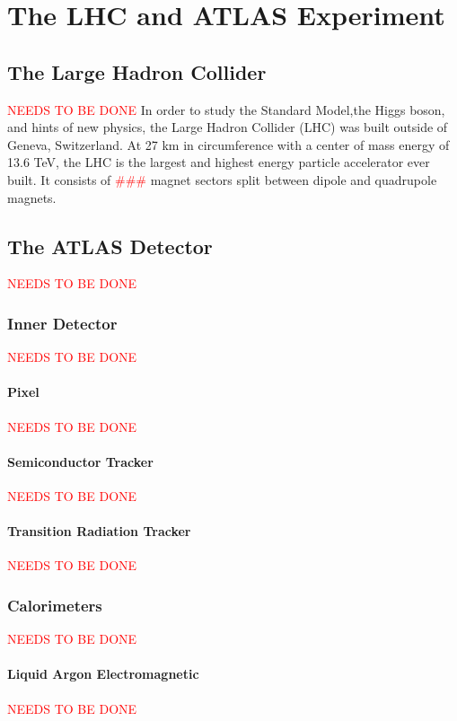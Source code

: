 \chapter{The LHC and ATLAS Experiment}

\section{The Large Hadron Collider}{
	\textcolor{red}{NEEDS TO BE DONE}
}
	In order to study the Standard Model,the Higgs boson, and hints of new physics, the Large Hadron Collider (LHC) was built outside of Geneva, Switzerland. At 27 km in circumference with a center of mass energy of 13.6 TeV, the LHC is the largest and highest energy particle accelerator ever built. It consists of \textcolor{red}{###} magnet sectors split between dipole and quadrupole magnets.

\section{The ATLAS Detector}{
	\textcolor{red}{NEEDS TO BE DONE}
}

	\subsection{Inner Detector}{
		\textcolor{red}{NEEDS TO BE DONE}
	}

		\subsubsection{Pixel}{
			\textcolor{red}{NEEDS TO BE DONE}
		}

		\subsubsection{Semiconductor Tracker}{
			\textcolor{red}{NEEDS TO BE DONE}
		}

		\subsubsection{Transition Radiation Tracker}{
			\textcolor{red}{NEEDS TO BE DONE}
		}

	\subsection{Calorimeters}{
		\textcolor{red}{NEEDS TO BE DONE}
	}

		\subsubsection{Liquid Argon Electromagnetic}{
			\textcolor{red}{NEEDS TO BE DONE}
		}

